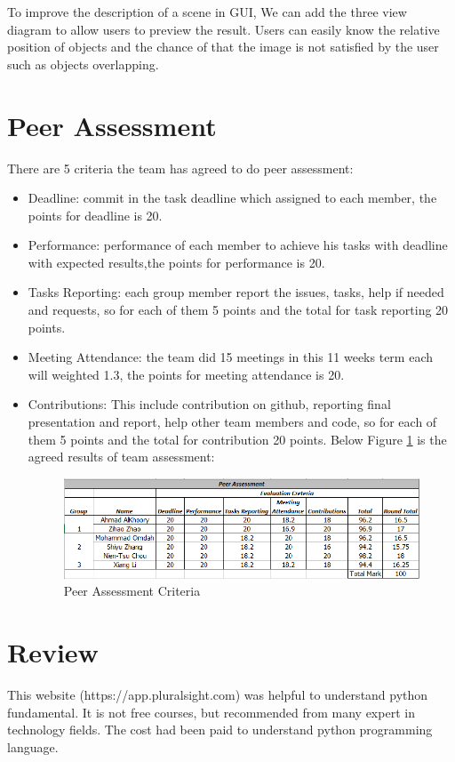\documentclass[a4paper, 12pt]{article}
\begin{document}
To improve the description of a scene in GUI, We can add the three view diagram to allow users to preview the result. Users can easily know the relative position of objects and the chance of that the image is not satisfied by the user such as objects overlapping.  

\section{Peer Assessment}
There are 5 criteria the team has agreed to do peer assessment:
\begin{itemize}
\item Deadline: commit in the task deadline which assigned to each member, the points for deadline is 20.
\item Performance: performance of each member to achieve his tasks with deadline with expected results,the points for performance is 20. 
\item Tasks Reporting: each group member report the issues, tasks, help if needed and requests, so for each of them 5 points and the total for task reporting 20 points.
\item Meeting Attendance:	the team did 15 meetings in this 11 weeks term each will weighted 1.3, the points for meeting attendance is 20.
\item Contributions: This include contribution on github, reporting final presentation and report, help other team members and code, so for each of them 5 points and the total for contribution 20 points. Below Figure \ref{fig:Peerass} is the agreed results of team assessment:

\begin{figure}[ht]
\includegraphics[width=\linewidth]{peer_assessment.PNG}
\caption{Peer Assessment Criteria}
\label{fig:Peerass}
\end{figure}

\end{itemize}

\section{Review}
This website (https://app.pluralsight.com) was helpful to understand python fundamental. It is not free courses, but recommended from many expert in technology fields. The cost had been paid to understand python programming language.
\end{document}
